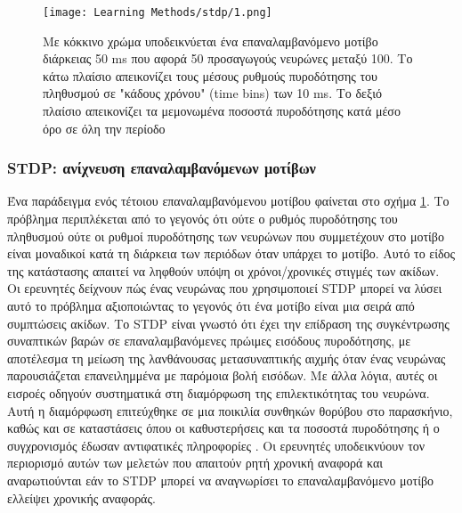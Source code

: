 \documentclass[12pt]{report}
\begin{document}
\begin{figure}[htp]
    \centering
    \texttt{[image: Learning Methods/stdp/1.png]}
    \caption{Με κόκκινο χρώμα υποδεικνύεται ένα επαναλαμβανόμενο μοτίβο διάρκειας 50 \textlatin{ms} που αφορά 50 προσαγωγούς νευρώνες μεταξύ 100. Το κάτω πλαίσιο απεικονίζει τους μέσους ρυθμούς πυροδότησης του πληθυσμού σε "κάδους χρόνου" (\textlatin{time bins}) των 10 \textlatin{ms}. Το δεξιό πλαίσιο απεικονίζει τα μεμονωμένα ποσοστά πυροδότησης κατά μέσο όρο σε όλη την περίοδο}
    \label{fig:stdp-1}
\end{figure}
\subsubsection{\textlatin{STDP}: ανίχνευση επαναλαμβανόμενων μοτίβων}
Ένα παράδειγμα ενός τέτοιου επαναλαμβανόμενου μοτίβου φαίνεται στο σχήμα \ref{fig:stdp-1}. Το πρόβλημα περιπλέκεται από το γεγονός ότι ούτε ο ρυθμός πυροδότησης του πληθυσμού ούτε οι ρυθμοί πυροδότησης των νευρώνων που συμμετέχουν στο μοτίβο είναι μοναδικοί κατά τη διάρκεια των περιόδων όταν υπάρχει το μοτίβο. Αυτό το είδος της κατάστασης απαιτεί να ληφθούν υπόψη οι χρόνοι/χρονικές στιγμές των ακίδων. Οι ερευνητές δείχνουν πώς ένας νευρώνας που χρησιμοποιεί \textlatin{STDP} μπορεί να λύσει αυτό το πρόβλημα αξιοποιώντας το γεγονός ότι ένα μοτίβο είναι μια σειρά από συμπτώσεις ακίδων. Το \textlatin{STDP} είναι γνωστό ότι έχει την επίδραση της συγκέντρωσης συναπτικών βαρών σε επαναλαμβανόμενες πρώιμες εισόδους πυροδότησης, με αποτέλεσμα τη μείωση της λανθάνουσας μετασυναπτικής αιχμής όταν ένας νευρώνας παρουσιάζεται επανειλημμένα με παρόμοια βολή εισόδων. Με άλλα λόγια, αυτές οι εισροές οδηγούν συστηματικά στη διαμόρφωση της επιλεκτικότητας του νευρώνα. Αυτή η διαμόρφωση επιτεύχθηκε σε μια ποικιλία συνθηκών θορύβου στο παρασκήνιο, καθώς και σε καταστάσεις όπου οι καθυστερήσεις και τα ποσοστά πυροδότησης ή ο συγχρονισμός έδωσαν αντιφατικές πληροφορίες \cite {rossum2000} \cite {guyonneau2005} \cite {masquelier2007}. Οι ερευνητές υποδεικνύουν τον περιορισμό αυτών των μελετών που απαιτούν ρητή χρονική αναφορά και αναρωτιούνται εάν το \textlatin{STDP} μπορεί να αναγνωρίσει το επαναλαμβανόμενο μοτίβο ελλείψει χρονικής αναφοράς.
\end{document}
